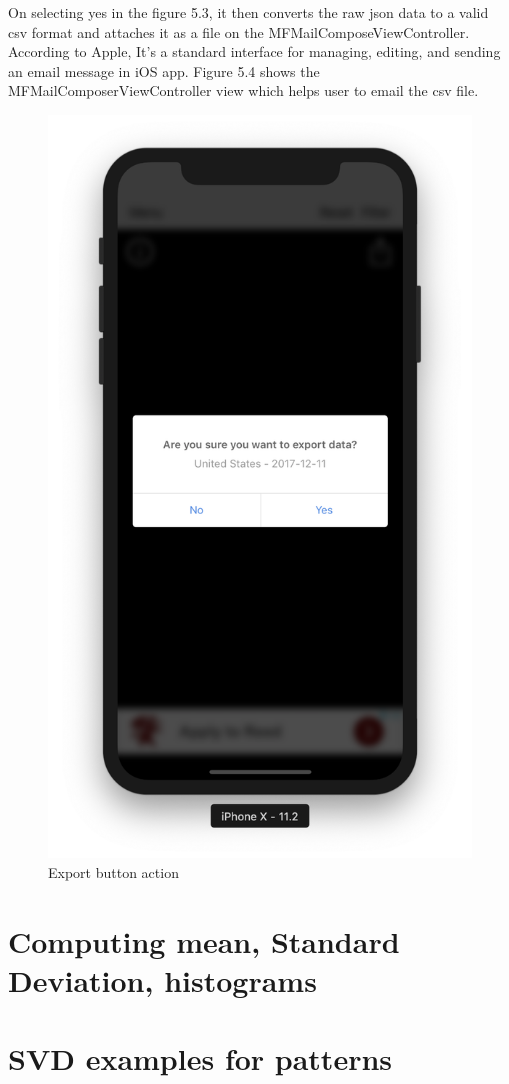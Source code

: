 \begin{itemize}
     \newpage
    
    On selecting yes in the figure 5.3, it then converts the raw \gls{json} data to a valid \gls{csv} format and attaches it as a file on the MFMailComposeViewController. \\
    
    
    According to Apple, It's a standard interface for managing, editing, and sending an email message in \gls{iOS} app. Figure 5.4 shows the MFMailComposerViewController view which helps user to email the \gls{csv} file.
    
    \begin{figure}[H]
            \centering
            \includegraphics[width=0.5\linewidth]{figures/ch5/export_view.png}
            \caption{\label{fig:info_button} Export button action}
    \end{figure}
    
\end{itemize}

\section{Computing mean, Standard Deviation, histograms}

\section{SVD examples for patterns}


